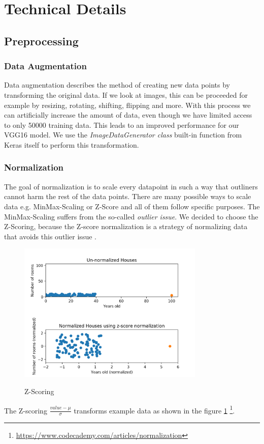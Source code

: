 \documentclass[journal]{IEEEtran}
\begin{document}
\section{Technical Details}
\label{sec:techDetails}
\subsection{Preprocessing}
\subsubsection{Data Augmentation}
\noindent Data augmentation describes the method of creating new data points by transforming the original data. If we look at images, this can be proceeded for example by resizing, rotating, shifting, flipping and more.
With this process we can artificially increase the amount of data, even though we have limited access to only 50000 training data. 
This leads to an improved performance for our VGG16 model. 
We use the \textit{ImageDataGenerator class} built-in function from Keras itself to perform this transformation. \\

\subsubsection{Normalization}
\noindent The goal of normalization is to scale every datapoint in such a way that outliners cannot harm the rest of the data points. There are many possible ways to scale data e.g. MinMax-Scaling or Z-Score and all of them follow specific purposes. 
The MinMax-Scaling suffers from the so-called \textit{outlier issue}.
We decided to choose the Z-Scoring, because the Z-score normalization is a strategy of normalizing data that avoids this outlier issue \cite{RN6}. \\
\begin{figure}
  \begin{center}
  \includegraphics[width=3.5in]{photo/z-score.png}\\
  \caption{Z-Scoring}\label{zscore}
  \end{center}
\end{figure}
The Z-scoring \(\frac{value - \mu}{\sigma}\) transforms example data as shown in the figure \ref{zscore} \footnote{\href{https://www.codecademy.com/articles/normalization}{https://www.codecademy.com/articles/normalization}}.
\end{document}
